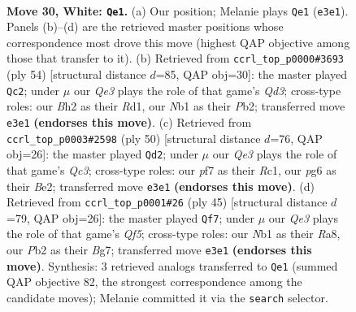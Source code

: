 \documentclass[11pt]{article}
\begin{document}
\clearpage

\begin{figure}[p]\centering
\begin{subfigure}{0.46\textwidth}\centering
\resizebox{\linewidth}{!}{%
\newchessgame
\chessboard[
  setfen={r5k1/1p3pb1/5qp1/p2p4/2nn3p/4Q2P/PP3PPB/RN1B2K1 w - - 2 30},
  showmover=false,
  pgfstyle=straightmove, color=movearrow, markmove={e3-e1}
]}
\caption{}
\end{subfigure}\hfill
\begin{subfigure}{0.46\textwidth}\centering
\resizebox{\linewidth}{!}{%
\newchessgame
\chessboard[
  setfen={4r1k1/3qbpp1/p2p3p/1pnP4/8/P1BQ1N1P/1P3PP1/3R2K1 w - - 0 28},
  showmover=false,
  pgfstyle=straightmove, color=movearrow, markmove={d3-c2}
]}
\caption{}
\end{subfigure}
\\[4pt]
\begin{subfigure}{0.46\textwidth}\centering
\resizebox{\linewidth}{!}{%
\newchessgame
\chessboard[
  setfen={2br2k1/1q1p1pp1/p3p2p/2BnP3/P4P2/2Q5/1P2B1PP/2R3K1 w - - 2 26},
  showmover=false,
  pgfstyle=straightmove, color=movearrow, markmove={c3-d2}
]}
\caption{}
\end{subfigure}\hfill
\begin{subfigure}{0.46\textwidth}\centering
\resizebox{\linewidth}{!}{%
\newchessgame
\chessboard[
  setfen={r5k1/6bp/pn1p2p1/1ppP4/4Nq2/1P3N1P/P4PP1/3QR1K1 b - - 1 23},
  showmover=false,
  pgfstyle=straightmove, color=movearrow, markmove={f4-f7}
]}
\caption{}
\end{subfigure}
\caption{\textbf{Move 30, White: \texttt{Qe1}.} (a) Our position; Melanie plays \texttt{Qe1} (\texttt{e3e1}). Panels (b)--(d) are the retrieved master positions whose correspondence most drove this move (highest QAP objective among those that transfer to it). (b) Retrieved from \texttt{ccrl\_top\_p0000\#3693} (ply 54) [structural distance $d$=85, QAP obj=30]: the master played \texttt{Qc2}; under $\mu$ our \emph{Qe3} plays the role of that game's \emph{Qd3}; cross-type roles: our \emph{B}h2 as their \emph{R}d1, our \emph{N}b1 as their \emph{P}b2; transferred move \texttt{e3e1} \textbf{(endorses this move)}. (c) Retrieved from \texttt{ccrl\_top\_p0003\#2598} (ply 50) [structural distance $d$=76, QAP obj=26]: the master played \texttt{Qd2}; under $\mu$ our \emph{Qe3} plays the role of that game's \emph{Qc3}; cross-type roles: our \emph{p}f7 as their \emph{R}c1, our \emph{p}g6 as their \emph{B}e2; transferred move \texttt{e3e1} \textbf{(endorses this move)}. (d) Retrieved from \texttt{ccrl\_top\_p0001\#26} (ply 45) [structural distance $d$=79, QAP obj=26]: the master played \texttt{Qf7}; under $\mu$ our \emph{Qe3} plays the role of that game's \emph{Qf5}; cross-type roles: our \emph{N}b1 as their \emph{R}a8, our \emph{P}b2 as their \emph{B}g7; transferred move \texttt{e3e1} \textbf{(endorses this move)}. Synthesis: 3 retrieved analogs transferred to \texttt{Qe1} (summed QAP objective 82, the strongest correspondence among the candidate moves); Melanie committed it via the \texttt{search} selector.}
\label{fig:thought-m58}
\end{figure}
\end{document}
